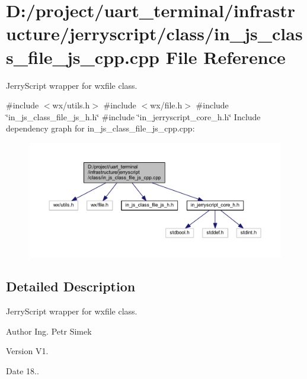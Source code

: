 \section{D\+:/project/uart\+\_\+terminal/infrastructure/jerryscript/class/in\+\_\+js\+\_\+class\+\_\+file\+\_\+js\+\_\+cpp.cpp File Reference}
\label{in__js__class__file__js__cpp_8cpp}


Jerry\+Script wrapper for wxfile class.  


{\ttfamily \#include $<$wx/utils.\+h$>$}\newline
{\ttfamily \#include $<$wx/file.\+h$>$}\newline
{\ttfamily \#include \char`\"{}in\+\_\+js\+\_\+class\+\_\+file\+\_\+js\+\_\+h.\+h\char`\"{}}\newline
{\ttfamily \#include \char`\"{}in\+\_\+jerryscript\+\_\+core\+\_\+h.\+h\char`\"{}}\newline
Include dependency graph for in\+\_\+js\+\_\+class\+\_\+file\+\_\+js\+\_\+cpp.\+cpp\+:
\nopagebreak
\begin{figure}[H]
\begin{center}
\leavevmode
\includegraphics[width=350pt]{in__js__class__file__js__cpp_8cpp__incl}
\end{center}
\end{figure}


\subsection{Detailed Description}
Jerry\+Script wrapper for wxfile class. 

\begin{DoxyAuthor}{Author}
Ing. Petr Simek 
\end{DoxyAuthor}
\begin{DoxyVersion}{Version}
V1. 
\end{DoxyVersion}
\begin{DoxyDate}{Date}
18.. 
\end{DoxyDate}
